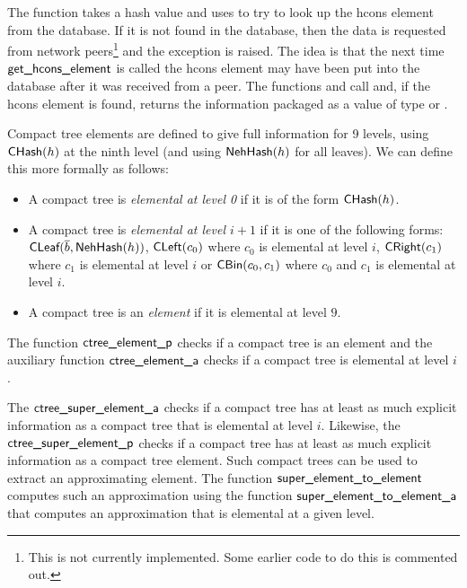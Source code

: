 The function {} takes a hash value and
uses {} to try to look up the hcons element from the database.
If it is not found in the database,
then the data is requested from network peers\footnote{This is not currently implemented. Some earlier code to do this is commented out.}
and the exception {} is raised.
The idea is that the next time ${\constr{get\_hcons\_element}}$ is
called the hcons element
may have been put into the database after it was received from a peer.
The functions {} and {}
call {} and, if the hcons element is found,
returns the information packaged as a value of type {} or {}.

Compact tree elements are defined to give full information for 9 levels, using
${\constr{CHash}}(h)$ at the ninth level (and using ${\constr{NehHash}}(h)$ for all leaves).
We can define this more formally as follows:
\begin{itemize}
\item A compact tree is {\em{elemental at level 0}} if it is of the form ${\constr{CHash}}(h)$.
\item A compact tree is {\em{elemental at level $i+1$}} if it is one of the following forms:
${\constr{CLeaf}}(\overline{b},{\constr{NehHash}}(h))$,
${\constr{CLeft}}(c_0)$ where $c_0$ is elemental at level $i$,
${\constr{CRight}}(c_1)$ where $c_1$ is elemental at level $i$
or
${\constr{CBin}}(c_0,c_1)$ where $c_0$ and $c_1$ is elemental at level $i$.
\item A compact tree is an {\em{element}} if it is elemental at level $9$.
\end{itemize}
The function ${\func{ctree\_element\_p}}$ checks if a compact tree is an element
and the auxiliary function ${\func{ctree\_element\_a}}$ checks if a compact
tree is elemental at level $i$.

The ${\func{ctree\_super\_element\_a}}$ checks if a compact tree has
at least as much explicit information as a compact tree that is elemental at level $i$.
Likewise, the ${\func{ctree\_super\_element\_p}}$ checks if a compact tree
has at least as much explicit information as a compact tree element.
Such compact trees can be used to extract an approximating element.
The function ${\func{super\_element\_to\_element}}$ computes such an approximation
using the function ${\func{super\_element\_to\_element\_a}}$
that computes an approximation that is elemental at a given level.

